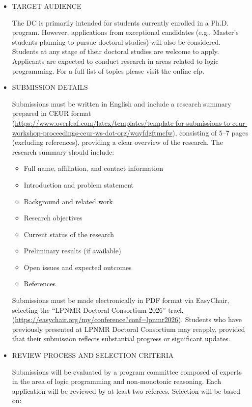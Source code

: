 \documentclass[prodmode,acmtecs]{acmsmall} %
\begin{document}
\begin{itemize}
\item  TARGET AUDIENCE 
 
  The DC is primarily intended for students currently enrolled in a Ph.D. program. However, applications from exceptional candidates (e.g., Master’s students planning to pursue doctoral studies) will also be considered. Students at any stage of their doctoral studies are welcome to apply. Applicants are expected to conduct research in areas related to logic programming. For a full list of topics please visit the online cfp.  
 
\item  SUBMISSION DETAILS 
 
  Submissions must be written in English and include a research summary prepared in CEUR format (\href{https://www.overleaf.com/latex/templates/template-for-submissions-to-ceur-workshop-proceedings-ceur-ws-dot-org/wqyfdgftmcfw}{https://www.overleaf.com/latex/templates/template-for-submissions-to-ceur-workshop-proceedings-ceur-ws-dot-org/wqyfdgftmcfw}), consisting of 5–7 pages (excluding references), providing a clear overview of the research. The research summary should include: 
 
\begin{itemize}\item  Full name, affiliation, and contact information
\item  Introduction and problem statement
\item  Background and related work
\item  Research objectives
\item  Current status of the research
\item  Preliminary results (if available)
\item  Open issues and expected outcomes
\item  References
\end{itemize} 
  Submissions must be made electronically in PDF format via EasyChair, selecting the “LPNMR Doctoral Consortium 2026” track (\href{https://easychair.org/my/conference?conf=lpnmr2026}{https://easychair.org/my/conference?conf=lpnmr2026}). Students who have previously presented at LPNMR Doctoral Consortium may reapply, provided that their submission reflects substantial progress or significant updates. 
 
\item  REVIEW PROCESS AND SELECTION CRITERIA 
 
  Submissions will be evaluated by a program committee composed of experts in the area of logic programming and non-monotonic reasoning. Each application will be reviewed by at least two referees. Selection will be based on: 
 

\end{itemize}
\end{document}
